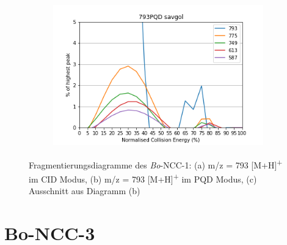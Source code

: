 \begin{figure}[!htbp]
  \begin{subfigure}[b]{0.5\textwidth}
    \includegraphics[width=\textwidth]{content/Anhang/ESIMS/Bo-NCC-1/793PQD-793savgolv5.png}
    \caption{}
  \end{subfigure}
  
  \caption[Fragmentierungsdiagramme des \textit{Bo}-NCC-1, Quelle: Autor]{Fragmentierungsdiagramme des \textit{Bo}-NCC-1: (a) m/z = 793 [M+H]\textsuperscript{+} im CID Modus, (b) m/z = 793 [M+H]\textsuperscript{+} im PQD Modus, (c) Ausschnitt aus Diagramm (b)}
\end{figure}

\pagebreak
\section{Bo-NCC-3}

